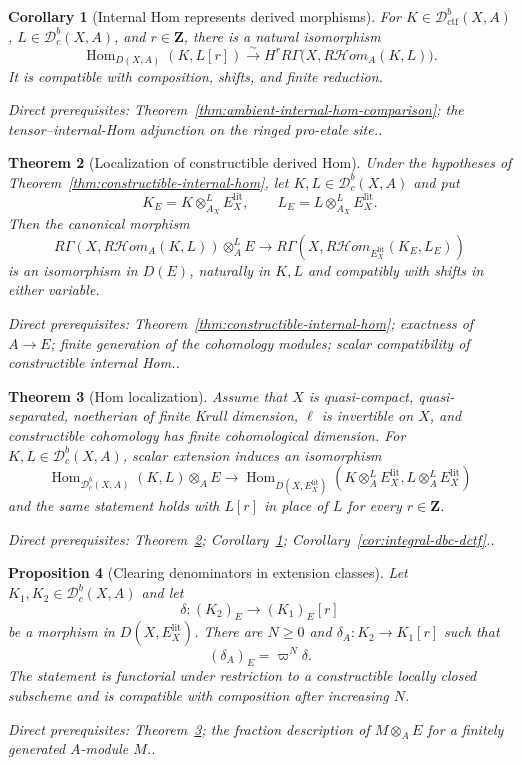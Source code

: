\documentclass[10pt]{article}
\newtheorem{theorem}{Theorem}[section]
\newtheorem{proposition}[theorem]{Proposition}
\newtheorem{corollary}[theorem]{Corollary}
\theoremstyle{definition}
\newcommand{\Dbc}{\mathcal D^b_c}
\newcommand{\Dctf}{\mathcal D^b_{\mathrm{ctf}}}
\newcommand{\Hom}{\operatorname{Hom}}
\newcommand{\depends}[1]{\par\smallskip\noindent\textit{Direct prerequisites:} #1.}
\begin{document}
\begin{corollary}[Internal Hom represents derived morphisms]
\label{cor:internal-hom-represents}
For $K\in\Dctf(X,A)$, $L\in\Dbc(X,A)$, and $r\in\mathbf Z$, there is a
natural isomorphism
\[
 \Hom_{D(X,A)}(K,L[r])
 \xrightarrow{\sim}
 H^rR\Gamma\bigl(X,R\mathcal Hom_A(K,L)\bigr).
\]
It is compatible with composition, shifts, and finite reduction.
\depends{Theorem~\ref{thm:ambient-internal-hom-comparison}; the
tensor--internal-Hom adjunction on the ringed pro-etale site.}
\end{corollary}

\begin{theorem}[Localization of constructible derived Hom]
\label{thm:derived-hom-localization}
Under the hypotheses of
Theorem~\ref{thm:constructible-internal-hom}, let
$K,L\in\Dbc(X,A)$ and put
\[
 K_E=K\otimes^L_{A_X}E_X^{\mathrm{lit}},
 \qquad
 L_E=L\otimes^L_{A_X}E_X^{\mathrm{lit}}.
\]
Then the canonical morphism
\[
 R\Gamma(X,R\mathcal Hom_A(K,L))\otimes_A^LE
 \longrightarrow
 R\Gamma\!\left(X,
 R\mathcal Hom_{E_X^{\mathrm{lit}}}(K_E,L_E)\right)
\]
is an isomorphism in $D(E)$, naturally in $K,L$ and compatibly with shifts
in either variable.
\depends{Theorem~\ref{thm:constructible-internal-hom}; exactness of
$A\to E$; finite generation of the cohomology modules; scalar compatibility
of constructible internal Hom.}
\end{theorem}

\begin{theorem}[Hom localization]\label{thm:hom-localization}
Assume that $X$ is quasi-compact, quasi-separated, noetherian of finite
Krull dimension, $\ell$ is invertible on $X$, and constructible cohomology
has finite cohomological dimension.  For $K,L\in\Dbc(X,A)$, scalar extension
induces an isomorphism
\[
 \Hom_{\Dbc(X,A)}(K,L)\otimes_AE
 \longrightarrow
 \Hom_{D(X,E_X^{\mathrm{lit}})}
 (K\otimes_A^LE_X^{\mathrm{lit}},L\otimes_A^LE_X^{\mathrm{lit}})
\]
and the same statement holds with $L[r]$ in place of $L$ for every
$r\in\mathbf Z$.
\depends{Theorem~\ref{thm:derived-hom-localization};
Corollary~\ref{cor:internal-hom-represents};
Corollary~\ref{cor:integral-dbc-dctf}.}
\end{theorem}

\begin{proposition}[Clearing denominators in extension classes]
\label{prop:clear-extension-denominators}
Let $K_1,K_2\in\Dbc(X,A)$ and let
\[
 \delta:(K_2)_E\longrightarrow(K_1)_E[r]
\]
be a morphism in $D(X,E_X^{\mathrm{lit}})$.  There are $N\geq0$ and
$\delta_A:K_2\to K_1[r]$ such that
\[
 (\delta_A)_E=\varpi^N\delta.
\]
The statement is functorial under restriction to a constructible locally
closed subscheme and is compatible with composition after increasing $N$.
\depends{Theorem~\ref{thm:hom-localization}; the fraction description of
$M\otimes_AE$ for a finitely generated $A$-module $M$.}
\end{proposition}
\end{document}

